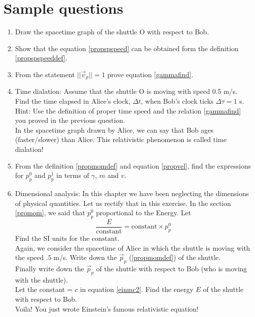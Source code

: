 \documentclass[10pt]{article}
\begin{document}
\section{Sample questions}
\begin{enumerate}
\item Draw the spacetime graph of the shuttle O with respect to Bob.
\vspace{250px}
\item Show that the equation \ref{propspspeed} can be obtained form the definition \ref{propspspeeddef}.
\vspace{250px}
\item From the statement $||\vec{v}_p||=1$ prove equation \ref{gammafind}.
\vspace{250px}
\item Time dialation: Assume that the shuttle O is moving with speed 0.5 m/s.  Find the time elapsed in Alice's clock, $\Delta t$, when Bob's clock ticks $\Delta \tau =1$ s. \\
Hint: Use the definition of proper time speed and the relation \ref{gammafind} you proved in the previous question.
\vspace{100px}\\
In the spacetime graph drawn by Alice, we can say that Bob ages \underline{\hspace{3cm}} (faster/slower) than Alice.  This relativistic phenomenon is called time dialation!
\item From the definition \ref{propmomdef} and equation \ref{propvel}, find the expressions for $p_p^0$ and $p_p^1$ in terms of $\gamma$, $m$ and $v$.
\vspace{250px}  
\item Dimensional analysis: In this chapter we have been neglecting the dimensions of physical quantities.  Let us rectify that in this exercise.  In the section \ref{promom}, we said that $p^0_p$ proportional to the Energy.  Let
\begin{equation} 
\label{einmc2}
\frac{E}{\text{constant}}=\text{constant}\times p^0_p  
\end{equation}
Find the SI units for the $\text{constant}$.
\vspace{100px}\\
Again, we consider the spacetime of Alice in which the shuttle is moving with the speed $.5$ m/s.  Write down the $\vec{p}_p$ (\ref{propmomdef}) of the shuttle.
\vspace{100px}\\
Finally write down the $\vec{p}_p$ of the shuttle with respect to Bob (who is moving with the shuttle).
\vspace{100px}\\
Let the constant = $c$ in equation \ref{einmc2}.  Find the energy $E$ of the shuttle with respect to Bob.  
\vspace{100px}\\
Voila! You just wrote Einstein's famous relativistic equation!
\end{enumerate}
\end{document}
